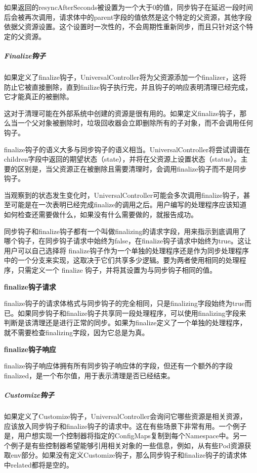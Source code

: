 \documentclass[macfonts,master]{njuthesis}
\begin{document}
如果返回的resyncAfterSeconds被设置为一个大于0的值，同步钩子在延迟一段时间后会被再次调用，请求体中的parent字段的值依然是这个特定的父资源，其他字段依据父资源设置。这个设置时一次性的，不会周期性重新同步，而且只针对这个特定的父资源。

\subparagraph{Finalize钩子}
如果定义了finalize钩子，UniversalController将为父资源添加一个finalizer，这将防止它被直接删除，直到finilize钩子执行完，并且钩子的响应表明清理已经完成，它才能真正的被删除。

这对于清理可能在外部系统中创建的资源是很有用的。如果定义finalize钩子，那么当一个父对象被删除时，垃圾回收器会立即删除所有的子对象，而不会调用任何钩子。

finalize钩子的语义大多与同步钩子的语义相当。UniversalController将尝试调谐在children字段中返回的期望状态（state），并将在父资源上设置状态（status）。主要的区别是，当父资源正在被删除且需要清理时，会调用finalize钩子而不是同步钩子。

当观察到的状态发生变化时，UniversalController可能会多次调用finalize钩子，甚至可能是在一次表明已经完成finalize的调用之后。用户编写的处理程序应该知道如何检查还需要做什么，如果没有什么需要做的，就报告成功。

同步钩子和finalize钩子都有一个叫做finalizing的请求字段，用来指示到底调用了哪个钩子，在同步钩子请求中始终为false，在finalize钩子请求中始终为true。这让用户可以自己选择将 finalize钩子作为一个单独的处理程序还是作为同步处理程序中的一个分支来实现，这取决于它们共享多少逻辑。要为两者使用相同的处理程序，只需定义一个 finalize 钩子，并将其设置为与同步钩子相同的值。

\textbf{finalize钩子请求}

finalize钩子的请求体格式与同步钩子的完全相同，只是finalizing字段始终为true而已。如果同步钩子和finalize钩子共享同一段处理程序，可以使用finalizing字段来判断是该清理还是进行正常的同步。如果为finalize定义了一个单独的处理程序，就不需要检查finalizing字段，因为它总是为真。

\textbf{finalize钩子响应}

finalize钩子响应体拥有所有同步钩子响应体的字段，但还有一个额外的字段finalized，是一个布尔值，用于表示清理是否已经结束。

\subparagraph{Customize钩子}

如果定义了Customize钩子，UniversalController会询问它哪些资源是相关资源，应该放入同步钩子和finalize钩子的请求中。这在有些场景下非常有用。一个例子是，用户想实现一个控制器将指定的ConfigMaps复制到每个Namespace中。另一个例子是有些控制器希望能够引用相关对象的一些信息，例如，从有些Pod资源获取env部分。如果没有定义Customize钩子，那么同步钩子和finalize钩子的请求体中related都将是空的。
\end{document}
